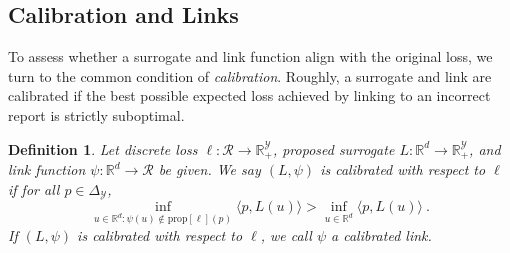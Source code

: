 \documentclass[11pt]{article}
\newcommand{\Comments}{1}
\newcommand{\mynote}[2]{\ifnum\Comments=1\textcolor{#1}{#2}\fi}
\newcommand{\raf}[1]{\mynote{darkgreen}{[RF: #1]}}
\newcommand{\reals}{\mathbb{R}}
\newcommand{\prop}[1]{\mathrm{prop}[#1]}
\newcommand{\simplex}{\Delta_\Y}
\newcommand{\R}{\mathcal{R}}
\newcommand{\X}{\mathcal{X}}
\newcommand{\Y}{\mathcal{Y}}
\newcommand{\inprod}[2]{\langle #1, #2 \rangle}%
\newtheorem{definition}{Definition}
\begin{document}
\subsection{Calibration and Links}
\label{subsec:calibration-links}


To assess whether a surrogate and link function align with the original loss, we turn to the common condition of \emph{calibration}.
Roughly, a surrogate and link are calibrated if the best possible expected loss achieved by linking to an incorrect report is strictly suboptimal.





\begin{definition}
  \label{def:calibrated}
  Let discrete loss $\ell:\R\to\reals^\Y_+$, proposed surrogate $L:\reals^d\to\reals^\Y_+$, and link function $\psi:\reals^d\to\R$ be given.
  We say $(L,\psi)$ is \emph{calibrated} with respect to $\ell$ if
for all $p \in \simplex$,
  \begin{equation}
    \label{eq:calibrated}
  \inf_{u \in \reals^d : \psi(u) \not\in \prop{\ell}(p)} \inprod{p}{L(u)} > \inf_{u \in \reals^d} \inprod{p}{L(u)}~.
  \end{equation}
  If $(L, \psi)$ is calibrated with respect to $\ell$, we call $\psi$ a \emph{calibrated link.}
\end{definition}
\end{document}
